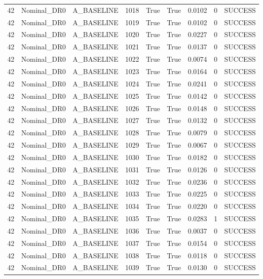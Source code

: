 \documentclass[11pt,a4paper,oneside]{book}
\begin{document}
\begin{longtable}{l l l l l l l l l}
42 & Nominal\_DR0 & A\_BASELINE & 1018 & True & True & 0.0102 & 0 & SUCCESS \\
42 & Nominal\_DR0 & A\_BASELINE & 1019 & True & True & 0.0102 & 0 & SUCCESS \\
42 & Nominal\_DR0 & A\_BASELINE & 1020 & True & True & 0.0227 & 0 & SUCCESS \\
42 & Nominal\_DR0 & A\_BASELINE & 1021 & True & True & 0.0137 & 0 & SUCCESS \\
42 & Nominal\_DR0 & A\_BASELINE & 1022 & True & True & 0.0074 & 0 & SUCCESS \\
42 & Nominal\_DR0 & A\_BASELINE & 1023 & True & True & 0.0164 & 0 & SUCCESS \\
42 & Nominal\_DR0 & A\_BASELINE & 1024 & True & True & 0.0241 & 0 & SUCCESS \\
42 & Nominal\_DR0 & A\_BASELINE & 1025 & True & True & 0.0142 & 0 & SUCCESS \\
42 & Nominal\_DR0 & A\_BASELINE & 1026 & True & True & 0.0148 & 0 & SUCCESS \\
42 & Nominal\_DR0 & A\_BASELINE & 1027 & True & True & 0.0132 & 0 & SUCCESS \\
42 & Nominal\_DR0 & A\_BASELINE & 1028 & True & True & 0.0079 & 0 & SUCCESS \\
42 & Nominal\_DR0 & A\_BASELINE & 1029 & True & True & 0.0067 & 0 & SUCCESS \\
42 & Nominal\_DR0 & A\_BASELINE & 1030 & True & True & 0.0182 & 0 & SUCCESS \\
42 & Nominal\_DR0 & A\_BASELINE & 1031 & True & True & 0.0126 & 0 & SUCCESS \\
42 & Nominal\_DR0 & A\_BASELINE & 1032 & True & True & 0.0236 & 0 & SUCCESS \\
42 & Nominal\_DR0 & A\_BASELINE & 1033 & True & True & 0.0225 & 0 & SUCCESS \\
42 & Nominal\_DR0 & A\_BASELINE & 1034 & True & True & 0.0220 & 0 & SUCCESS \\
42 & Nominal\_DR0 & A\_BASELINE & 1035 & True & True & 0.0283 & 1 & SUCCESS \\
42 & Nominal\_DR0 & A\_BASELINE & 1036 & True & True & 0.0037 & 0 & SUCCESS \\
42 & Nominal\_DR0 & A\_BASELINE & 1037 & True & True & 0.0154 & 0 & SUCCESS \\
42 & Nominal\_DR0 & A\_BASELINE & 1038 & True & True & 0.0118 & 0 & SUCCESS \\
42 & Nominal\_DR0 & A\_BASELINE & 1039 & True & True & 0.0130 & 0 & SUCCESS \\

\end{longtable}
\end{document}
